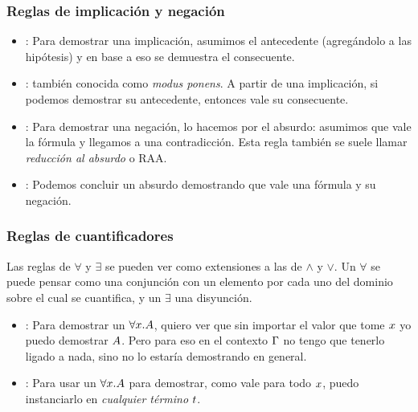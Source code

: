 \subsubsection{Reglas de implicación y negación}

\begin{multicols}{2}
    \proofTreeImpI
    \proofTreeImpE
\end{multicols}

\proofSpacing

\begin{multicols}{2}
    \proofTreeNotI
    \proofTreeNotE
\end{multicols}

\begin{itemize}
    \item {}: Para demostrar una implicación, asumimos el antecedente
    (agregándolo a las hipótesis) y en base a eso se demuestra el consecuente.
    \item {}: también conocida como \textit{modus ponens}. A partir de
    una implicación, si podemos demostrar su antecedente, entonces vale su consecuente.
    \item {}: Para demostrar una negación, lo hacemos por el absurdo:
    asumimos que vale la fórmula y llegamos a una contradicción. Esta regla
    también se suele llamar \textit{reducción al absurdo} o RAA.
    \item {}: Podemos concluir un absurdo demostrando que vale una
    fórmula y su negación.
\end{itemize}

\subsubsection{Reglas de cuantificadores}


Las reglas de $\forall$ y $\exists$ se pueden ver como extensiones a las de
$\wedge$ y $\vee$. Un $\forall$ se puede pensar como una conjunción con un
elemento por cada uno del dominio sobre el cual se cuantifica, y un $\exists$
una disyunción.

\begin{multicols}{2}
    \proofTreeForallI
    \proofTreeForallE
\end{multicols}

\begin{itemize}
    \item {}: Para demostrar un $\forall x. A$, quiero ver que sin importar el valor que tome $x$ yo puedo demostrar $A$. Pero para eso en el contexto $\Gamma$ no tengo que tenerlo ligado a nada, sino no lo estaría demostrando en general.
    \item {}: Para usar un $\forall x.A$ para demostrar, como
    vale para todo $x$, puedo instanciarlo en \textit{cualquier término} $t$.
\end{itemize}

